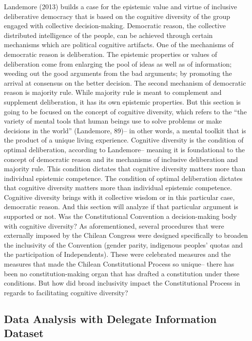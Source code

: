 \documentclass[
  man]{apa6}
\begin{document}
Landemore (2013) builds a case for the epistemic value and virtue of inclusive deliberative democracy that is based on the cognitive diversity of the group engaged with collective decision-making. Democratic reason, the collective distributed intelligence of the people, can be achieved through certain mechanisms which are political cognitive artifacts. One of the mechanisms of democratic reason is deliberation. The epistemic properties or values of deliberation come from enlarging the pool of ideas as well as of information; weeding out the good arguments from the bad arguments; by promoting the arrival at consensus on the better decision. The second mechanism of democratic reason is majority rule. While majority rule is meant to complement and supplement deliberation, it has its own epistemic properties.
But this section is going to be focused on the concept of cognitive diversity, which refers to the ``the variety of mental tools that human beings use to solve problems or make decisions in the world'' (Landemore, 89)-- in other words, a mental toolkit that is the product of a unique living experience. Cognitive diversity is the condition of optimal deliberation, according to Landemore-- meaning it is foundational to the concept of democratic reason and its mechanisms of inclusive deliberation and majority rule. This condition dictates that cognitive diversity matters more than individual epistemic competence. The condition of optimal deliberation dictates that cognitive diversity matters more than individual epistemic competence. Cognitive diversity brings with it collective wisdom or in this particular case, democratic reason.
And this section will analyze if that particular argument is supported or not. Was the Constitutional Convention a decision-making body with cognitive diversity? As aforementioned, several procedures that were externally imposed by the Chilean Congress were designed specifically to broaden the inclusivity of the Convention (gender parity, indigenous peoples' quotas and the participation of Independents). These were celebrated measures and the measures that made the Chilean Constitutional Process so unique-- there has been no constitution-making organ that has drafted a constitution under these conditions. But how did broad inclusivity impact the Constitutional Process in regards to facilitating cognitive diversity?

\hypertarget{data-analysis-with-delegate-information-dataset}{%
\subsection{Data Analysis with Delegate Information Dataset}\label{data-analysis-with-delegate-information-dataset}}
\end{document}
